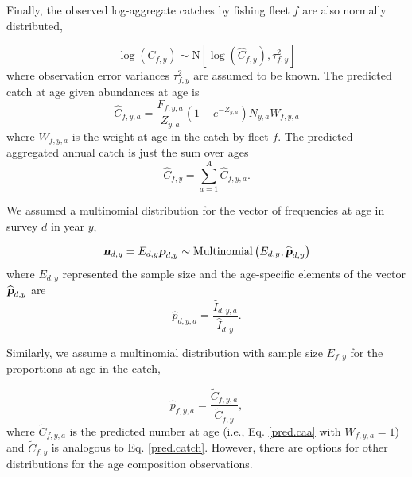 \documentclass[12pt,letterpaper, leqno]{article}
\begin{document}
Finally, the observed log-aggregate catches by fishing fleet $f$ are also normally distributed,

\vspace{-12pt}
\begin{equation*}
\log\left(C_{f,y}\right) \sim \text{N}\left[\log\left(\widehat C_{f,y}\right), \tau^2_{f,y}\right]
\end{equation*}
where observation error variances $\tau^2_{f,y}$ are assumed to be known. The predicted catch at age given abundances at age is
\begin{equation}\label{pred.caa}
\widehat C_{f,y,a} = \frac{F_{f,y,a}}{Z_{y,a}}\left(1 - e^{-Z_{y,a}}\right) N_{y,a} W_{f,y,a}
\end{equation}
where $W_{f,y,a}$ is the weight at age in the catch by fleet $f$. The predicted aggregated annual catch is just the sum over ages
\begin{equation}\label{pred.catch}
\widehat C_{f,y} = \sum^A_{a=1} \widehat C_{f,y,a}.
\end{equation}

We assumed a multinomial distribution for the vector of frequencies at age in survey $d$ in year $y$, 

\vspace{-12pt}
\begin{equation}\label{multinom.dist}
\textbf{\textsl{n}}_{d,y} = E_{d,y} \textsl{\textbf{p}}_{d,y} \sim \text{Multinomial}\left(E_{d,y}, \widehat {\textsl{\textbf{p}}} _{d,y}\right)
\end{equation}
where $E_{d,y}$ represented the sample size and the age-specific elements of the vector $\widehat {\textsl{\textbf{p}}} _{d,y}$ are
\vspace{-12pt}
\begin{equation*}
  \widehat p_{d,y,a} = \frac{\widehat I_{d,y,a}}{\widehat I_{d,y}}.
\end{equation*}

Similarly, we assume a multinomial distribution with sample size $E_{f,y}$ for the proportions at age in the catch,

\vspace{-12pt}
\begin{equation*}
  \widehat p_{f,y,a} = \frac{\widetilde C_{f,y,a}}{\widetilde C_{f,y}},
\end{equation*}
where $\widetilde C_{f,y,a}$ is the predicted number at age (i.e., Eq. \ref{pred.caa} with $W_{f,y,a} = 1$) and $\widetilde C_{f,y}$ is analogous to Eq. \ref{pred.catch}. However, there are options for other distributions for the age composition observations.
\end{document}
